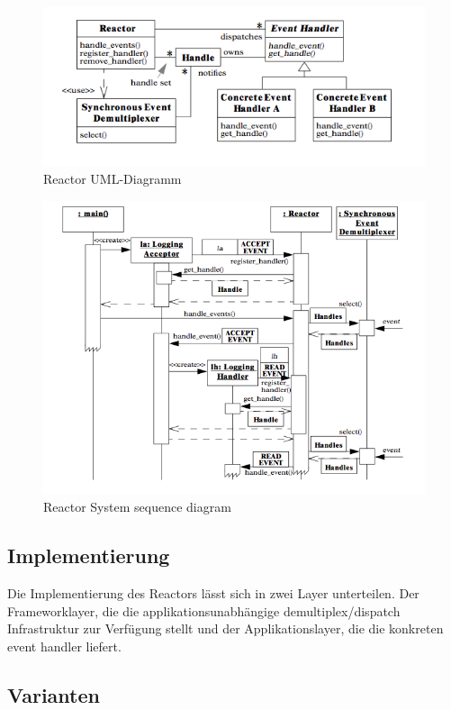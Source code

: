 \begin{figure}[H]
	\centering
	\includegraphics[width=12cm]{content/posa2/reactor/images/uml-diagram.png}
	\caption{Reactor UML-Diagramm}
\end{figure}



\begin{figure}[H]
	\centering
	\includegraphics[width=12cm]{content/posa2/reactor/images/ssd.png}
	\caption{Reactor System sequence diagram}
\end{figure}


\subsection{Implementierung}

Die Implementierung des Reactors lässt sich in zwei Layer unterteilen. Der Frameworklayer, die die applikationsunabhängige demultiplex/dispatch Infrastruktur zur Verfügung stellt und der Applikationslayer, die die konkreten event handler liefert.


\subsection{Varianten}

